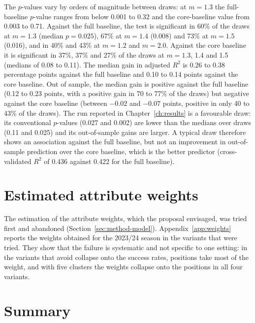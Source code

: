 The $p$-values vary by orders of magnitude between draws: at $m=1.3$ the full-baseline $p$-value ranges from below 0.001 to 0.32 and the core-baseline value from 0.003 to 0.71. Against the full baseline, the test is significant in 60\% of the draws at $m=1.3$ (median $p=0.025$), 67\% at $m=1.4$ (0.008) and 73\% at $m=1.5$ (0.016), and in 40\% and 43\% at $m=1.2$ and $m=2.0$. Against the core baseline it is significant in 37\%, 37\% and 27\% of the draws at $m=1.3$, 1.4 and 1.5 (medians of 0.08 to 0.11). The median gain in adjusted $R^2$ is 0.26 to 0.38 percentage points against the full baseline and 0.10 to 0.14 points against the core baseline. Out of sample, the median gain is positive against the full baseline (0.12 to 0.23 points, with a positive gain in 70 to 77\% of the draws) but negative against the core baseline (between $-0.02$ and $-0.07$ points, positive in only 40 to 43\% of the draws). The run reported in Chapter~\ref{ch:results} is a favourable draw: its conventional $p$-values (0.027 and 0.002) are lower than the medians over draws (0.11 and 0.025) and its out-of-sample gains are larger. A typical draw therefore shows an association against the full baseline, but not an improvement in out-of-sample prediction over the core baseline, which is the better predictor (cross-validated $R^2$ of 0.436 against 0.422 for the full baseline).

\section{Estimated attribute weights}
\label{sec:rob-weights}

The estimation of the attribute weights, which the proposal envisaged, was tried first and abandoned (Section~\ref{sec:method-model}). Appendix~\ref{app:weights} reports the weights obtained for the 2023/24 season in the variants that were tried. They show that the failure is systematic and not specific to one setting: in the variants that avoid collapse onto the success rates, positions take most of the weight, and with five clusters the weights collapse onto the positions in all four variants.

\section{Summary}

